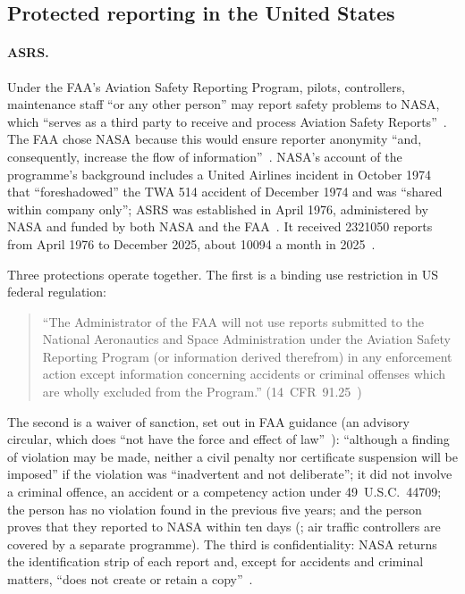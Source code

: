 \documentclass[11pt]{article}
\begin{document}
\subsection{Protected reporting in the United States}\label{sec:us}

\paragraph{ASRS.} Under the FAA's Aviation Safety Reporting Program, pilots, controllers, maintenance staff ``or any other person'' may report safety problems to NASA, which ``serves as a third party to receive and process Aviation Safety Reports''~\cite[para.~1]{faa2021}. The FAA chose NASA because this would ensure reporter anonymity ``and, consequently, increase the flow of information''~\cite[para.~6.2]{faa2021}. NASA's account of the programme's background includes a United Airlines incident in October 1974 that ``foreshadowed'' the TWA 514 accident of December 1974 and was ``shared within company only''; ASRS was established in April 1976, administered by NASA and funded by both NASA and the FAA~\cite[slides 6 and~10]{nasaasrs}. It received \num{2321050} reports from April 1976 to December 2025, about \num{10094} a month in 2025~\cite{nasaasrs}.

Three protections operate together. The first is a binding use restriction in US federal regulation:

\begin{quote}
``The Administrator of the FAA will not use reports submitted to the National Aeronautics and Space Administration under the Aviation Safety Reporting Program (or information derived therefrom) in any enforcement action except information concerning accidents or criminal offenses which are wholly excluded from the Program.'' (14~CFR~91.25~\cite{cfr9125})
\end{quote}

The second is a waiver of sanction, set out in FAA guidance (an advisory circular, which does ``not have the force and effect of law''~\cite[para.~2]{faa2021}): ``although a finding of violation may be made, neither a civil penalty nor certificate suspension will be imposed'' if the violation was ``inadvertent and not deliberate''; it did not involve a criminal offence, an accident or a competency action under 49~U.S.C.~44709; the person has no violation found in the previous five years; and the person proves that they reported to NASA within ten days (\cite[para.~12.3]{faa2021}; air traffic controllers are covered by a separate programme). The third is confidentiality: NASA returns the identification strip of each report and, except for accidents and criminal matters, ``does not create or retain a copy''~\cite[para.~10.2]{faa2021}.
\end{document}
